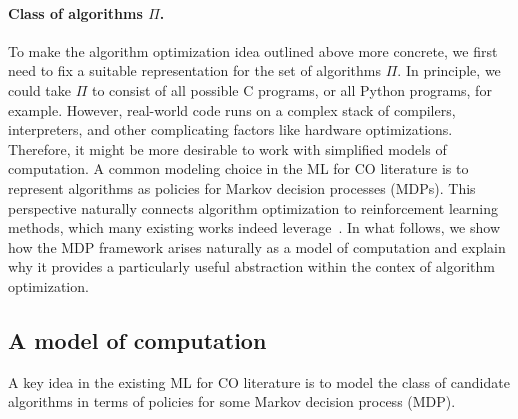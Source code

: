 \documentclass[a4paper]{report}
\theoremstyle{definition}
\theoremstyle{plain}
\begin{document}
\paragraph{Class of algorithms $\Pi$.}
To make the algorithm optimization idea outlined above more concrete, we first
need to fix a suitable representation for the set of algorithms $\Pi$. In
principle, we could take $\Pi$ to consist of all possible C programs, or all
Python programs, for example. However, real-world code runs on a complex stack
of compilers, interpreters, and other complicating factors like hardware
optimizations. Therefore, it might be more desirable to work with simplified
models of computation. A common modeling choice in the ML for CO literature is
to represent algorithms as policies for Markov decision processes (MDPs). This
perspective naturally connects algorithm optimization to reinforcement learning
methods, which many existing works indeed
leverage~\cite{mazyavkinaReinforcementLearningCombinatorial2020,daiLearningCombinatorialOptimization2018,koolAttentionLearnSolve2019}.
In what follows, we show how the MDP framework arises naturally as a model of
computation and explain why it provides a particularly useful abstraction within
the contex of algorithm optimization.

\subsection{A model of computation}

A key idea in the existing ML for CO literature is to model the class of
candidate algorithms in terms of policies for some Markov decision process
(MDP).
\end{document}
